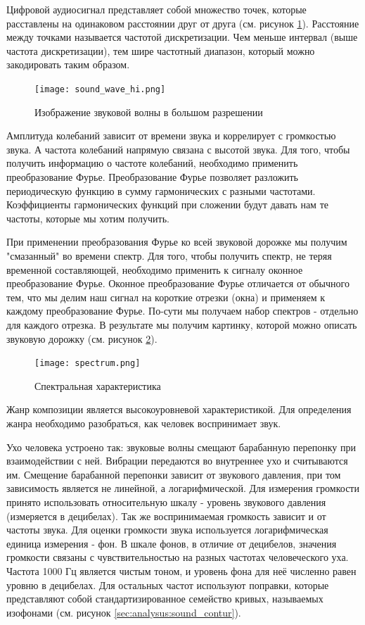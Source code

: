 Цифровой аудиосигнал представляет собой множество точек, которые расставлены на одинаковом расстоянии друг от друга (см. рисунок \ref{sec:analysus:sound_wave_hi}). Расстояние между точками называется частотой дискретизации. Чем меньше интервал (выше частота дискретизации), тем шире частотный диапазон, который можно закодировать таким образом.

\begin{figure}[t]
\centering
	\texttt{[image: sound\_wave\_hi.png]}
	\caption{Изображение звуковой волны в большом разрешении}
	\label{sec:analysus:sound_wave_hi}
\end{figure}

Амплитуда колебаний зависит от времени звука и коррелирует с громкостью звука. А частота колебаний напрямую связана с высотой звука. Для того, чтобы получить информацию о частоте колебаний, необходимо применить преобразование Фурье. Преобразование Фурье позволяет разложить периодическую функцию в сумму гармонических с разными частотами. Коэффициенты гармонических функций при сложении будут давать нам те частоты, которые мы хотим получить.

При применении преобразования Фурье ко всей звуковой дорожке мы получим "смазанный" во времени спектр. Для того, чтобы получить спектр, не теряя временной составляющей, необходимо применить к сигналу оконное преобразование Фурье. Оконное преобразование Фурье отличается от обычного тем, что мы делим наш сигнал на короткие отрезки (окна) и применяем к каждому преобразование Фурье. По-сути мы получаем набор спектров - отдельно для каждого отрезка. В результате мы получим картинку, которой можно описать звуковую дорожку (см. рисунок \ref{sec:analysus:spectrum}).

\begin{figure}[t]
\centering
	\texttt{[image: spectrum.png]}
	\caption{Спектральная характеристика}
	\label{sec:analysus:spectrum}
\end{figure}

Жанр композиции является высокоуровневой характеристикой. Для определения жанра необходимо разобраться, как человек воспринимает звук.

Ухо человека устроено так: звуковые волны смещают барабанную перепонку при взаимодействии с ней. Вибрации передаются во внутреннее ухо и считываются им. Смещение барабанной перепонки зависит от звукового давления, при том зависимость является не линейной, а логарифмической. Для измерения громкости принято использовать относительную шкалу - уровень звукового давления (измеряется в децибелах). Так же воспринимаемая громкость зависит и от частоты звука. Для оценки громкости звука используется логарифмическая единица измерения - фон. В шкале фонов, в отличие от децибелов, значения громкости связаны с чувствительностью на разных частотах человеческого уха. Частота 1000 Гц является чистым тоном, и уровень фона для неё численно равен уровню в децибелах. Для остальных частот используют поправки, которые представляют собой стандартизированное семейство кривых, называемых изофонами (см. рисунок \ref{sec:analysus:sound_contur}).

